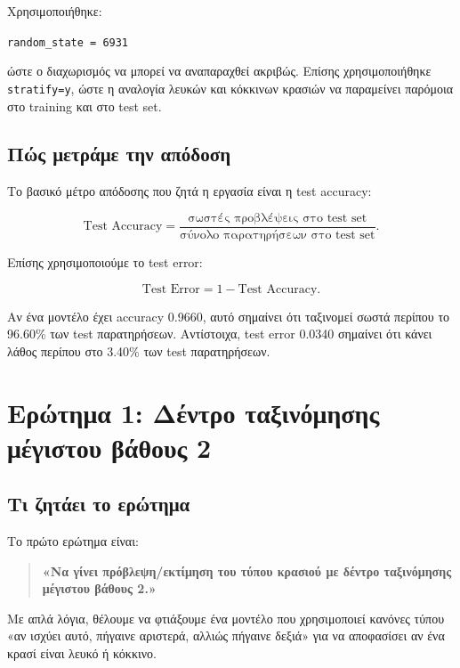 \documentclass[12pt,a4paper]{article}
\newcommand{\code}[1]{\texttt{\textenglish{#1}}}
\begin{document}
Χρησιμοποιήθηκε:

\begin{center}
\code{random\_state = 6931}
\end{center}

ώστε ο διαχωρισμός να μπορεί να αναπαραχθεί ακριβώς. Επίσης χρησιμοποιήθηκε
\code{stratify=y}, ώστε η αναλογία λευκών και κόκκινων κρασιών να παραμείνει
παρόμοια στο training και στο test set.

\subsection{Πώς μετράμε την απόδοση}

Το βασικό μέτρο απόδοσης που ζητά η εργασία είναι η test accuracy:

\[
    \text{Test Accuracy} =
    \frac{\text{σωστές προβλέψεις στο test set}}
         {\text{σύνολο παρατηρήσεων στο test set}}.
\]

Επίσης χρησιμοποιούμε το test error:

\[
    \text{Test Error} = 1 - \text{Test Accuracy}.
\]

Αν ένα μοντέλο έχει accuracy 0.9660, αυτό σημαίνει ότι ταξινομεί σωστά περίπου
το 96.60\% των test παρατηρήσεων. Αντίστοιχα, test error 0.0340 σημαίνει ότι
κάνει λάθος περίπου στο 3.40\% των test παρατηρήσεων.

\section{Ερώτημα 1: Δέντρο ταξινόμησης μέγιστου βάθους 2}

\subsection{Τι ζητάει το ερώτημα}

Το πρώτο ερώτημα είναι:

\begin{quote}
\textbf{«Να γίνει πρόβλεψη/εκτίμηση του τύπου κρασιού με δέντρο ταξινόμησης
μέγιστου βάθους 2.»}
\end{quote}

Με απλά λόγια, θέλουμε να φτιάξουμε ένα μοντέλο που χρησιμοποιεί κανόνες τύπου
«αν ισχύει αυτό, πήγαινε αριστερά, αλλιώς πήγαινε δεξιά» για να αποφασίσει αν
ένα κρασί είναι λευκό ή κόκκινο.
\end{document}
